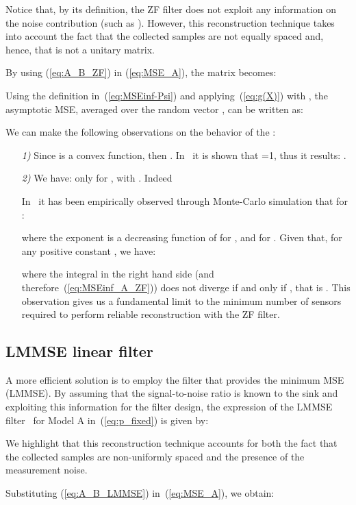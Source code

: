 \documentclass[final, a4paper]{IEEEtran}
\begin{document}
Notice that, by its definition, the ZF filter does not exploit any information on the
noise contribution (such as ). However,  this
reconstruction technique
takes into account the fact that the collected samples are not equally spaced and, hence,
that   is not a unitary matrix.

By using (\ref{eq:A_B_ZF}) in (\ref{eq:MSE_A}), the matrix  becomes:

Using the definition in~(\ref{eq:MSEinf-Psi}) and applying~(\ref{eq:g(X)})
with , the asymptotic MSE,
averaged over the random vector , can be written as:

We can make the following observations on the behavior of the :
\begin{itemize}
\item[{\em 1)}] Since  is a convex function, then .
In~\cite{NordioChiasseriniViterbo} it is shown that =1, thus it results: .

\item[{\em 2)}] We have:
 only for , with .
Indeed



In~\cite{NordioChiasseriniViterbo} it has been  empirically observed through Monte-Carlo simulation
that for :

where the exponent  is a decreasing function of  for
, and  for .
Given that, for any positive constant , we have:

where the integral in the right hand side (and
therefore~(\ref{eq:MSEinf_A_ZF})) does not diverge if and only if
, that is . This observation gives
us a fundamental limit to the minimum number of sensors required to
perform reliable reconstruction with the ZF filter.
\end{itemize}


\subsection{LMMSE linear filter}
\label{sec:A_LMMSE}
A more efficient solution is to employ the filter  that provides the
minimum MSE (LMMSE).
By assuming that the signal-to-noise ratio  is known to the sink and exploiting
this information for the filter design,
the expression of the LMMSE filter~\cite{Verdu_book} for
Model A in~(\ref{eq:p_fixed}) is given by:

We highlight that this reconstruction technique accounts for both the fact that
the collected samples are non-uniformly spaced and the presence of the measurement noise.

Substituting (\ref{eq:A_B_LMMSE}) in~(\ref{eq:MSE_A}), we obtain:
\end{document}
